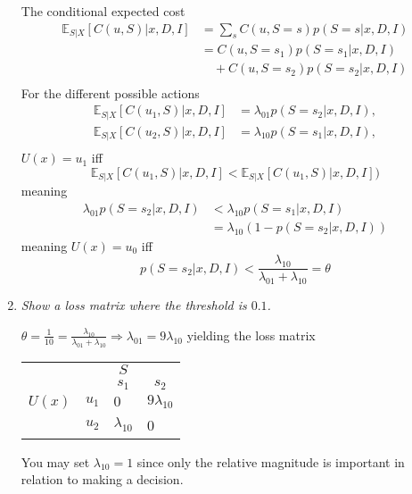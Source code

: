 \begin{example}
\begin{enumerate}
			The conditional expected cost
			\begin{equation}
				\begin{split}
					\mathbb{E}_{S|X}[C(u, S)|x,D,I] & = \sum_sC(u,S=s)p(S=s|x,D,I)\\
					& = C(u,S=s_1)p(S=s_1|x,D,I)\\
					& \quad+C(u,S=s_2)p(S=s_2|x,D,I)\\
				\end{split}
			\end{equation}
			For the different possible actions
			\begin{equation}
				\begin{split}
					\mathbb{E}_{S|X}[C(u_1, S)|x,D,I] &= \lambda_{01}p(S=s_2|x,D,I),\\
					\mathbb{E}_{S|X}[C(u_2, S)|x,D,I] &= \lambda_{10}p(S=s_1|x,D,I),\\
				\end{split}
			\end{equation}
			$U(x)=u_1$ iff
			\begin{equation}
				\mathbb{E}_{S|X}[C(u_1,S)|x,D,I]<\mathbb{E}_{S|X}[C(u_1,S)|x,D,I])
			\end{equation}
			meaning
			\begin{equation}
				\begin{split}
					\lambda_{01}p(S=s_2|x,D,I)&<\lambda_{10}p(S = s_1|x,D,I)\\
					&=\lambda_{10}(1-p(S =s_2|x,D,I))
				\end{split}
			\end{equation}
			meaning $U(x) = u_0$ iff
			\begin{equation}
				p(S=s_2|x,D,I)<\frac{\lambda_{10}}{\lambda_{01}+\lambda_{10}}=\theta
			\end{equation}
			
			
			\item \emph{Show a loss matrix where the threshold is $0.1$.}\newline
			
			$\theta = \frac{1}{10}=\frac{\lambda_{10}}{\lambda_{01}+\lambda_{10}} \Rightarrow \lambda_{01}=9\lambda_{10}$ yielding the loss matrix
			
			\begin{center}
				\begin{tabular}{ c  c  c  c }
					&& $S$& \\
					&& $s_1$ & $s_2$  \\
					\cline{3-4}
					$U(x)$ & $u_1$& \multicolumn{1}{|l}{$0$} &\multicolumn{1}{l|}{$9\lambda_{10}$}  \\
					& $u_2$& \multicolumn{1}{|l}{$\lambda_{10}$} & \multicolumn{1}{l|}{0} \\
					\cline{3-4}
				\end{tabular}
			\end{center}
			
			You may set $\lambda_{10}=1$ since only the relative magnitude is important in relation to making a decision.
			
		\end{enumerate}
		
		
	\end{example}
	
